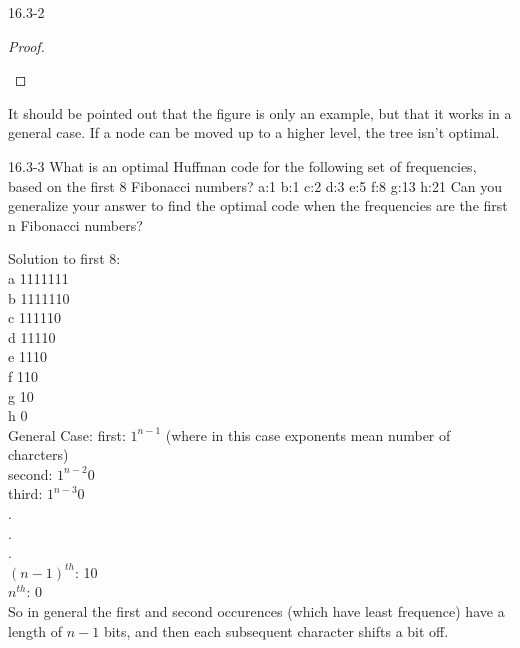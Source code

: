 \begin{problem}{16.3-2}
\begin{solution}
\begin{proof}
\begin{figure}[H]
      \end{figure}
    \end{proof}
    It should be pointed out that the figure is only an example, but that it works in a general case. If a node can be
    moved up to a higher level, the tree isn't optimal.
  \end{solution}
\end{problem}

\newpage \begin{problem}{16.3-3}
  What is an optimal Huffman code for the following set of frequencies, based on the first 8 Fibonacci numbers?
  \br
  a:1 b:1 c:2 d:3 e:5 f:8 g:13 h:21
  \br
  Can you generalize your answer to find the optimal code when the frequencies are the first n Fibonacci numbers?
  \begin{solution}
    Solution to first 8: \\
    a 1111111 \\
    b 1111110 \\
    c 111110 \\
    d 11110 \\
    e 1110 \\
    f 110 \\
    g 10 \\
    h 0\\
    General Case:
    \br
    first: $1^{n-1}$ (where in this case exponents mean number of charcters) \\
    second: $1^{n-2}0$ \\
    third: $1^{n-3}0$ \\
    . \\
    . \\
    . \\
    $(n-1)^{th}$: 10 \\
    $n^{th}$: 0 \\
    So in general the first and second occurences (which have least frequence) have a length of $n-1$ bits, and then each subsequent character shifts a bit off.
  \end{solution}
\end{problem}



